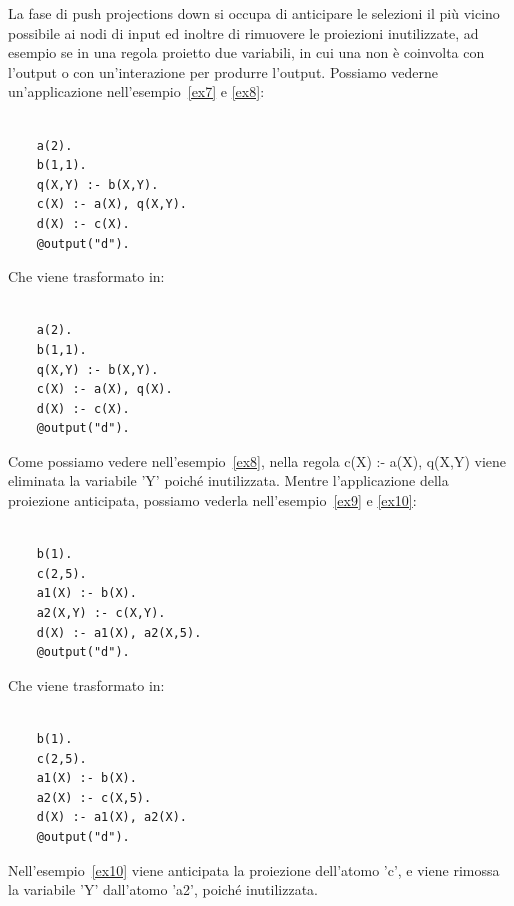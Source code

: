 La fase di push projections down si occupa di anticipare le selezioni il più vicino possibile ai nodi di input ed inoltre di rimuovere le proiezioni inutilizzate, ad esempio se in una regola proietto due variabili, in cui una non è coinvolta con l'output o con un'interazione per produrre l'output. Possiamo vederne un'applicazione nell'esempio~\ref{ex7} e \ref{ex8}:
\begin{example}\label{ex7}
\normalfont
{}
	\begin{lstlisting}
	
	a(2). 
	b(1,1). 
	q(X,Y) :- b(X,Y). 
	c(X) :- a(X), q(X,Y). 
	d(X) :- c(X). 
	@output("d").
	\end{lstlisting}
\end{example}
Che viene trasformato in:
\begin{example}\label{ex8}
\normalfont
{}
	\begin{lstlisting}
	
	a(2). 
	b(1,1). 
	q(X,Y) :- b(X,Y). 
	c(X) :- a(X), q(X). 
	d(X) :- c(X). 
	@output("d").
	\end{lstlisting}
\end{example}
Come possiamo vedere nell'esempio~\ref{ex8}, nella regola c(X) :- a(X), q(X,Y) viene eliminata la variabile 'Y' poiché inutilizzata. \newline
Mentre l'applicazione della proiezione anticipata, possiamo vederla nell'esempio~\ref{ex9} e \ref{ex10}:
\begin{example}\label{ex9}
\normalfont
{}
	\begin{lstlisting}
	
	b(1). 
	c(2,5). 
	a1(X) :- b(X). 
	a2(X,Y) :- c(X,Y). 
	d(X) :- a1(X), a2(X,5). 
	@output("d").
	\end{lstlisting}
\end{example}
Che viene trasformato in:
\begin{example}\label{ex10}
\normalfont
{}
	\begin{lstlisting}
	
	b(1). 
	c(2,5). 
	a1(X) :- b(X). 
	a2(X) :- c(X,5). 
	d(X) :- a1(X), a2(X). 
	@output("d").
	\end{lstlisting}
\end{example}
Nell'esempio~\ref{ex10} viene anticipata la proiezione dell'atomo 'c', e viene rimossa la variabile 'Y' dall'atomo 'a2', poiché inutilizzata. \newline \newline
